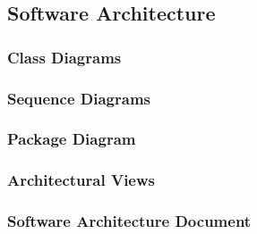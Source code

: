 \subsection{Software Architecture}
\subsubsection{Class Diagrams}
\subsubsection{Sequence Diagrams}
\subsubsection{Package Diagram}
\subsubsection{Architectural Views}
\subsubsection{Software Architecture Document}
